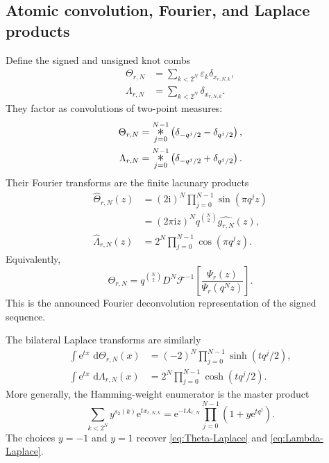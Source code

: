 \documentclass[11pt,oneside]{article}
\numberwithin{equation}{section}
\theoremstyle{definition}
\theoremstyle{remark}
\newcommand{\dd}{\,\mathrm d}
\newcommand{\e}{\mathrm e}
\newcommand{\ii}{\mathrm i}
\newcommand{\eps}{\varepsilon}
\newcommand{\cF}{\mathcal F}
\newcommand{\bigast}{\mathop{\text{\Large$\ast$}}\limits}
\begin{document}
\subsection{Atomic convolution, Fourier, and Laplace products}

Define the signed and unsigned knot combs
\begin{align}
 \Theta_{r,N}&=\sum_{k<2^N}\eps_k\delta_{x_{r,N,k}},       \label{eq:Theta-rN}\\
 \Lambda_{r,N}&=\sum_{k<2^N}\delta_{x_{r,N,k}}.           \label{eq:Lambda-rN}
\end{align}
They factor as convolutions of two-point measures:
\begin{align}
 \Theta_{r,N}
 &=\bigast_{j=0}^{N-1}
   \left(\delta_{-q^j/2}-\delta_{q^j/2}\right),           \label{eq:Theta-convolution}\\
 \Lambda_{r,N}
 &=\bigast_{j=0}^{N-1}
   \left(\delta_{-q^j/2}+\delta_{q^j/2}\right).           \label{eq:Lambda-convolution}
\end{align}
Their Fourier transforms are the finite lacunary products
\begin{align}
 \widehat\Theta_{r,N}(z)
 &=(2\ii)^N\prod_{j=0}^{N-1}\sin(\pi q^jz)                \label{eq:Theta-Fourier}\\
 &=(2\pi\ii z)^Nq^{\binom N2}\widehat{g_{r,N}}(z),       \label{eq:Theta-Fourier-spline}\\
 \widehat\Lambda_{r,N}(z)
 &=2^N\prod_{j=0}^{N-1}\cos(\pi q^jz).                   \label{eq:Lambda-Fourier}
\end{align}
Equivalently,
\begin{equation}
 \boxed{\displaystyle
 \Theta_{r,N}=q^{\binom N2}D^N\cF^{-1}\!\left[
   \frac{\Psi_r(z)}{\Psi_r(q^Nz)}\right].}               \label{eq:TM-Fourier-deconvolution}
\end{equation}
This is the announced Fourier deconvolution representation of the signed
sequence.

The bilateral Laplace transforms are similarly
\begin{align}
 \int\e^{tx}\,\dd\Theta_{r,N}(x)
 &=(-2)^N\prod_{j=0}^{N-1}\sinh(tq^j/2),                  \label{eq:Theta-Laplace}\\
 \int\e^{tx}\,\dd\Lambda_{r,N}(x)
 &=2^N\prod_{j=0}^{N-1}\cosh(tq^j/2).                    \label{eq:Lambda-Laplace}
\end{align}
More generally, the Hamming-weight enumerator is the master product
\begin{equation}
 \sum_{k<2^N}y^{s_2(k)}\e^{t x_{r,N,k}}
 =\e^{-tA_{r,N}}\prod_{j=0}^{N-1}(1+y\e^{tq^j}).          \label{eq:master-knot-enumerator}
\end{equation}
The choices $y=-1$ and $y=1$ recover
\eqref{eq:Theta-Laplace} and \eqref{eq:Lambda-Laplace}.
\end{document}

